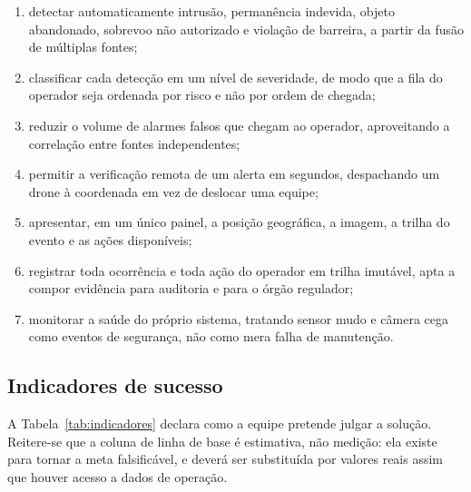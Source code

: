 \documentclass[12pt,a4paper,oneside]{article}
\begin{document}
\begin{enumerate}[label=\textbf{OE-\arabic*},leftmargin=*,itemsep=3pt,topsep=4pt]
  \item detectar automaticamente intrusão, permanência indevida, objeto
        abandonado, sobrevoo não autorizado e violação de barreira, a partir da
        fusão de múltiplas fontes;
  \item classificar cada detecção em um nível de severidade, de modo que a fila
        do operador seja ordenada por risco e não por ordem de chegada;
  \item reduzir o volume de alarmes falsos que chegam ao operador, aproveitando
        a correlação entre fontes independentes;
  \item permitir a verificação remota de um alerta em segundos, despachando um
        drone à coordenada em vez de deslocar uma equipe;
  \item apresentar, em um único painel, a posição geográfica, a imagem, a
        trilha do evento e as ações disponíveis;
  \item registrar toda ocorrência e toda ação do operador em trilha imutável,
        apta a compor evidência para auditoria e para o órgão regulador;
  \item monitorar a saúde do próprio sistema, tratando sensor mudo e câmera
        cega como eventos de segurança, não como mera falha de manutenção.
\end{enumerate}

\subsection{Indicadores de sucesso}

A Tabela~\ref{tab:indicadores} declara como a equipe pretende julgar a solução.
Reitere-se que a coluna de linha de base é estimativa, não medição: ela existe
para tornar a meta falsificável, e deverá ser substituída por valores reais
assim que houver acesso a dados de operação.
\end{document}
